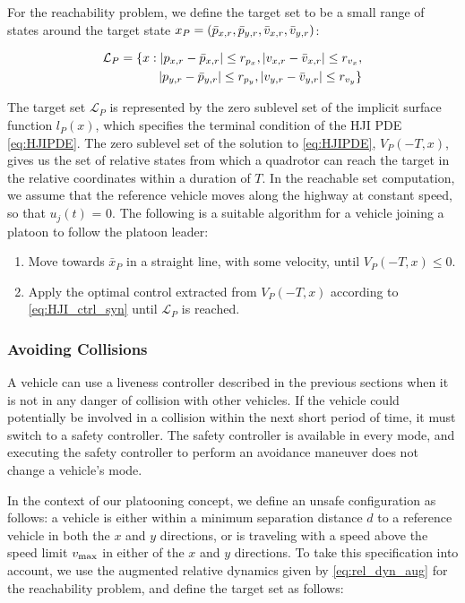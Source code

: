 For the reachability problem, we define the target set to be a small range of states around the target state $x_P = (\bar{p}_{x,r}, \bar{p}_{y,r}, \bar{v}_{x,r}, \bar{v}_{y,r})$:

\begin{equation}
\begin{aligned}
\mathcal{L}_P = \{x: |p_{x,r}-\bar{p}_{x,r}|\le r_{p_x}, |v_{x,r}-\bar{v}_{x,r}|\le r_{v_x}, \\
|p_{y,r} - \bar{p}_{y,r}| \le r_{p_y}, |v_{y,r} - \bar{v}_{y,r}|\le r_{v_y} \}
\end{aligned}
\end{equation}

The target set $\mathcal{L}_P$ is represented by the zero sublevel set of the implicit surface function $l_P(x)$, which specifies the terminal condition of the HJI PDE \eqref{eq:HJIPDE}. The zero sublevel set of the solution to \eqref{eq:HJIPDE}, $V_P(-T,x)$, gives us the set of relative states from which a quadrotor can reach the target in the relative coordinates within a duration of $T$. In the reachable set computation, we assume that the reference vehicle moves along the highway at constant speed, so that $u_j(t)$ = 0. The following is a suitable algorithm for a vehicle joining a platoon to follow the platoon leader:

\begin{enumerate}
\item Move towards $\bar{x}_P$ in a straight line, with some velocity, until $V_P(-T,x)\le 0$.
\item Apply the optimal control extracted from $V_P(-T,x)$ according to \eqref{eq:HJI_ctrl_syn} until $\mathcal{L}_P$ is reached.
\end{enumerate}

\subsubsection{Avoiding Collisions \label{sec:collision_ctrl}}
A vehicle can use a liveness controller described in the previous sections when it is not in any danger of collision with other vehicles. If the vehicle could potentially be involved in a collision within the next short period of time, it must switch to a safety controller. The safety controller is available in every mode, and executing the safety controller to perform an avoidance maneuver does not change a vehicle's mode. 

In the context of our platooning concept, we define an unsafe configuration as follows: a vehicle is either within a minimum separation distance $d$ to a reference vehicle in both the $x$ and $y$ directions, or is traveling with a speed above the speed limit $v_\text{max}$ in either of the $x$ and $y$ directions. To take this specification into account, we use the augmented relative dynamics given by \eqref{eq:rel_dyn_aug} for the reachability problem, and define the target set as follows:

